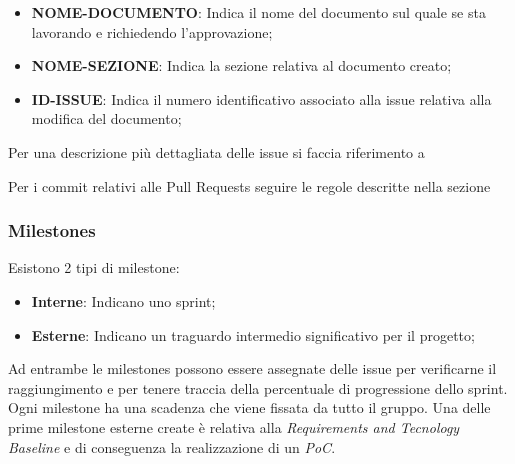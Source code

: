         \begin{itemize}
            \item \textbf{NOME-DOCUMENTO}: Indica il nome del documento sul quale se sta lavorando e richiedendo l'approvazione;
            \item \textbf{NOME-SEZIONE}: Indica la sezione relativa al documento creato;
            \item \textbf{ID-ISSUE}: Indica il numero identificativo associato alla issue relativa alla modifica del documento;
        \end{itemize}

        Per una descrizione più dettagliata delle issue si faccia riferimento a 

        Per i commit relativi alle Pull Requests seguire le regole descritte nella sezione 

        \subsubsection{Milestones}
        Esistono 2 tipi di milestone:
        \begin{itemize}
            \item \textbf{Interne}: Indicano uno sprint;
            \item \textbf{Esterne}: Indicano un traguardo intermedio significativo per il progetto;
        \end{itemize}
        Ad entrambe le milestones possono essere assegnate delle issue per verificarne il raggiungimento e per tenere traccia
        della percentuale di progressione dello sprint.
        Ogni milestone ha una scadenza che viene fissata da tutto il gruppo. Una delle prime milestone esterne create è
        relativa alla \textit{Requirements and Tecnology Baseline} e di conseguenza la realizzazione di un \textit{PoC}.


